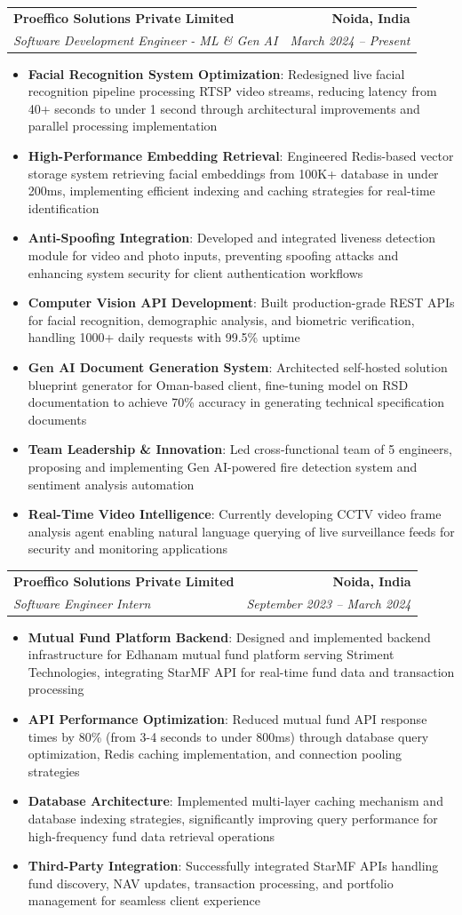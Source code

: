 \documentclass[a4paper,11pt]{article}
\makeatletter
\newcommand{\resumeItem}[2]{
  \item\small{
    \textbf{#1}{: #2 \vspace{-2pt}}
  }
}
\newcommand{\resumeSubheading}[4]{
  \vspace{-1pt}\item
    \begin{tabular*}{0.97\textwidth}[t]{l@{\extracolsep{\fill}}r}
      \textbf{#1} & \textbf{#2} \\
      \textit{\small#3} & \textit{\small #4} \\
    \end{tabular*}\vspace{-5pt}
}
\newcommand{\resumeItemListStart}{\begin{itemize}[leftmargin=0.15in]}
\newcommand{\resumeItemListEnd}{\end{itemize}\vspace{-5pt}}
\makeatother
\begin{document}
    \resumeSubheading
      {Proeffico Solutions Private Limited}{Noida, India}
      {Software Development Engineer - ML \& Gen AI}{March 2024 -- Present}
      \resumeItemListStart
        \resumeItem{Facial Recognition System Optimization}
          {Redesigned live facial recognition pipeline processing RTSP video streams, reducing latency from 40+ seconds to under 1 second through architectural improvements and parallel processing implementation}
        \resumeItem{High-Performance Embedding Retrieval}
          {Engineered Redis-based vector storage system retrieving facial embeddings from 100K+ database in under 200ms, implementing efficient indexing and caching strategies for real-time identification}
        \resumeItem{Anti-Spoofing Integration}
          {Developed and integrated liveness detection module for video and photo inputs, preventing spoofing attacks and enhancing system security for client authentication workflows}
        \resumeItem{Computer Vision API Development}
          {Built production-grade REST APIs for facial recognition, demographic analysis, and biometric verification, handling 1000+ daily requests with 99.5\% uptime}
        \resumeItem{Gen AI Document Generation System}
          {Architected self-hosted solution blueprint generator for Oman-based client, fine-tuning model on RSD documentation to achieve 70\% accuracy in generating technical specification documents}
        \resumeItem{Team Leadership \& Innovation}
          {Led cross-functional team of 5 engineers, proposing and implementing Gen AI-powered fire detection system and sentiment analysis automation }
        \resumeItem{Real-Time Video Intelligence}
          {Currently developing CCTV video frame analysis agent enabling natural language querying of live surveillance feeds for security and monitoring applications}
      \resumeItemListEnd
      
    \resumeSubheading
      {Proeffico Solutions Private Limited}{Noida, India}
      {Software Engineer Intern}{September 2023 -- March 2024}
      \resumeItemListStart
        \resumeItem{Mutual Fund Platform Backend}
          {Designed and implemented backend infrastructure for Edhanam mutual fund platform serving Striment Technologies, integrating StarMF API for real-time fund data and transaction processing}
        \resumeItem{API Performance Optimization}
          {Reduced mutual fund API response times by 80\% (from 3-4 seconds to under 800ms) through database query optimization, Redis caching implementation, and connection pooling strategies}
        \resumeItem{Database Architecture}
          {Implemented multi-layer caching mechanism and database indexing strategies, significantly improving query performance for high-frequency fund data retrieval operations}
        \resumeItem{Third-Party Integration}
          {Successfully integrated StarMF APIs handling fund discovery, NAV updates, transaction processing, and portfolio management for seamless client experience}
      \resumeItemListEnd
\end{document}
